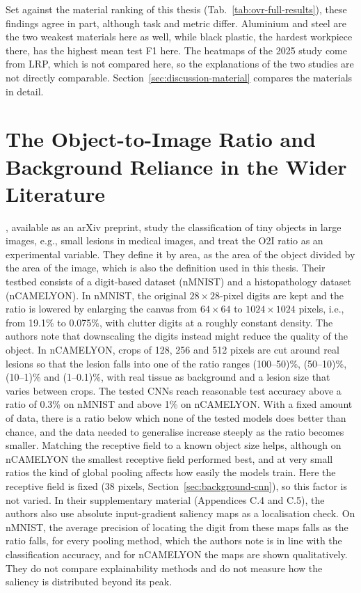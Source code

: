 Set against the material ranking of this thesis (Tab.~\ref{tab:ovr-full-results}),
these findings agree in part, although task and metric differ. Aluminium and steel are
the two weakest materials here as well, while black plastic, the hardest workpiece
there, has the highest mean test F1 here. The heatmaps of the 2025 study come from LRP,
which is not compared here, so the explanations of the two studies are not directly
comparable. Section~\ref{sec:discussion-material} compares the materials in detail.

\section{The Object-to-Image Ratio and Background Reliance in the Wider Literature}
\label{sec:related-work-o2i}

\citet{pawlowski2019needles}, available as an arXiv preprint, study the
classification of tiny objects in large images, e.g., small lesions in medical images, and treat the O2I ratio as an
experimental variable. They define it by area, as the area of the object divided by the
area of the image, which is also the definition used in this thesis. Their testbed
consists of a digit-based dataset (nMNIST) and a histopathology dataset (nCAMELYON). In
nMNIST, the original $28 \times 28$-pixel digits are kept and the ratio is lowered by
enlarging the canvas from $64 \times 64$ to $1024 \times 1024$ pixels, i.e., from 19.1\%
to 0.075\%, with clutter digits at a roughly constant density. The authors note that
downscaling the digits instead might reduce the quality of the object. In nCAMELYON,
crops of 128, 256 and 512 pixels are cut around real lesions so that the lesion falls
into one of the ratio ranges (100--50)\%, (50--10)\%, (10--1)\% and (1--0.1)\%, with real
tissue as background and a lesion size that varies between crops. The tested CNNs reach
reasonable test accuracy above a ratio of 0.3\% on nMNIST and above 1\% on nCAMELYON.
With a fixed amount of data, there is a ratio below which none of the tested models does
better than chance, and the data needed to generalise increase steeply as the ratio
becomes smaller. Matching the receptive field to a known object size helps, although on
nCAMELYON the smallest receptive field performed best, and at very small ratios the kind
of global pooling affects how easily the models train. Here the receptive field is
fixed (38 pixels, Section~\ref{sec:background-cnn}), so this factor is not varied. In
their supplementary material (Appendices C.4 and C.5), the authors also use absolute
input-gradient saliency maps as a localisation check. On nMNIST, the average precision
of locating the digit from these maps falls as the ratio falls, for every pooling
method, which the authors note is in line with the classification accuracy, and for
nCAMELYON the maps are shown qualitatively. They do not compare explainability methods
and do not measure how the saliency is distributed beyond its peak.


